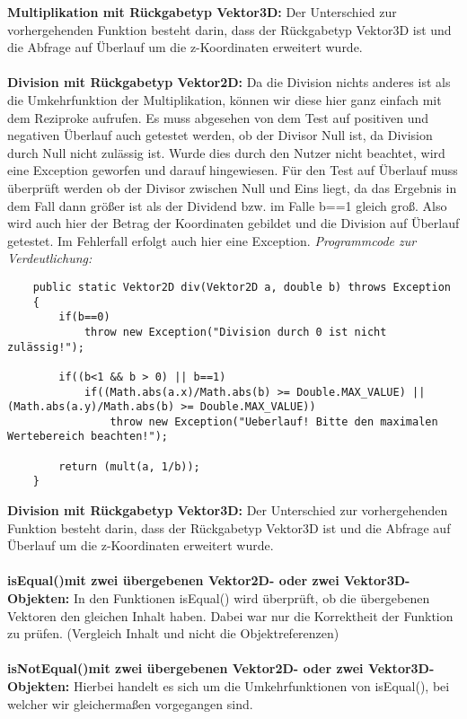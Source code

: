 \documentclass[a4paper,11pt]{scrartcl}
\begin{document}
\textbf{Multiplikation mit Rückgabetyp Vektor3D:} Der Unterschied zur vorhergehenden Funktion besteht darin, dass der Rückgabetyp Vektor3D ist und die Abfrage auf Überlauf um die z-Koordinaten erweitert wurde.\\
\\
\textbf{Division mit Rückgabetyp Vektor2D:} Da die Division nichts anderes ist als die Umkehrfunktion der Multiplikation, können wir diese hier ganz einfach mit dem Reziproke aufrufen. Es muss abgesehen von dem Test auf positiven und negativen Überlauf auch getestet werden, ob der Divisor Null ist, da Division durch Null nicht zulässig ist. Wurde dies durch den Nutzer nicht beachtet, wird eine Exception geworfen und darauf hingewiesen.
Für den Test auf Überlauf muss überprüft werden ob der Divisor zwischen Null und Eins liegt, da das Ergebnis in dem Fall dann größer ist als der Dividend bzw. im Falle b==1 gleich groß. Also wird auch hier der Betrag der Koordinaten gebildet und die Division auf Überlauf getestet. Im Fehlerfall erfolgt auch hier eine Exception.
\textit{Programmcode zur Verdeutlichung:}
\begin{lstlisting}
	public static Vektor2D div(Vektor2D a, double b) throws Exception
	{
		if(b==0)
			throw new Exception("Division durch 0 ist nicht zulässig!");
		
		if((b<1 && b > 0) || b==1)
			if((Math.abs(a.x)/Math.abs(b) >= Double.MAX_VALUE) || (Math.abs(a.y)/Math.abs(b) >= Double.MAX_VALUE))
				throw new Exception("Ueberlauf! Bitte den maximalen Wertebereich beachten!");
		
		return (mult(a, 1/b));
	}
\end{lstlisting} $\;$ \\
\textbf{Division mit Rückgabetyp Vektor3D:} Der Unterschied zur vorhergehenden Funktion besteht darin, dass der Rückgabetyp Vektor3D ist und die Abfrage auf Überlauf um die z-Koordinaten erweitert wurde.\\
\\
\textbf{isEqual()mit zwei übergebenen Vektor2D- oder zwei Vektor3D-Objekten: } In den Funktionen isEqual() wird überprüft, ob die übergebenen Vektoren den gleichen Inhalt haben. Dabei war nur die Korrektheit der Funktion zu prüfen. (Vergleich Inhalt und nicht die Objektreferenzen)\\
\\
\textbf{isNotEqual()mit zwei übergebenen Vektor2D- oder zwei Vektor3D-Objekten: } Hierbei handelt es sich um die Umkehrfunktionen von isEqual(), bei welcher wir gleichermaßen vorgegangen sind.\\
\end{document}
